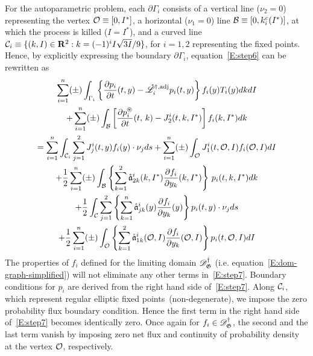 For the autoparametric problem, each $\partial\Gamma_i$ consists of a vertical line ($\nu_2=0$) representing the vertex ${\mathcal O}\equiv[0,I^*]$, a horizontal ($\nu_1=0$) line ${\mathcal B}\equiv[0,{k_i^c(I^*)}]$, at which the process is killed ($I=I^*$), and a curved line ${\mathcal C_i}\equiv \{(k,I)\in \mathbf R^2: k= (-1)^iI\sqrt{3I}/9\}$, for $i=1,2$ representing the fixed points. Hence, by explicitly expressing the boundary $\partial\Gamma_i$, equation~\eqref{E:step6} can be rewritten as
\begin{multline}
\sum_{i=1}^n (\pm) \int_{\Gamma_i} \left\{\frac{\partial p_i}{\partial t}(t,y) - \mathring {\mathscr L}^{\dagger,\text{adj}}_{i} p_{i} (t,y) \right\} f_i(y) T_{i}(y) dk dI\\
+ \sum_{i=1}^n (\pm) \int_{\mathcal B} \left[\frac{\partial p_i^\circledast}{\partial t}(t,\,k) - J_2^{i}(t,k,I^*) \right] f_i(k,I^*) dk\\
= \sum_{i=1}^n \int_{\mathcal C_i} \sum_{j=1}^2 J_j^i(t,y) f_i(y) \cdot \nu_j ds + \sum_{i=1}^n (\pm) \int_{\mathcal O} J_1^i(t,\mathcal O,I) f_i(\mathcal O,I) dI\\
+ \frac12 \sum_{i=1}^n (\pm) \int_{\mathcal B} \left\{\sum_{k=1}^2 \mathring{\mathfrak a}_{2k}^i(k,I^*) \frac{\partial f_i}{\partial y_k}(k,I^*)\right\}\, p_i(t, k, I^*) dk\\
+ \frac12 \int_{\mathcal C} \sum_{j=1}^2 \left\{\sum_{k=1}^n \mathring{\mathfrak a}_{jk}^i(y) \frac{\partial f_i}{\partial y_k}(y)\right\} p_{i}(t,y) \cdot \nu_j ds\\
+ \frac12 \sum_{i=1}^n (\pm) \int_{\mathcal O} \left\{ \sum_{k=1}^2 \mathring{\mathfrak a}_{1k}^i(\mathcal O,I)
\frac{\partial f_i}{\partial y_k}(\mathcal O,I)\right\} p_i(t,\mathcal O,I) dI
\label{E:step7}
\end{multline}
The properties of $f_i$ defined for the limiting domain $\mathscr{D}_\mathfrak G^\dag$ (i.e. equation~\eqref{E:dom-graph-simplified}) will not eliminate any other terms in~\eqref{E:step7}. Boundary conditions for $p_i$ are derived from the right hand side of~\eqref{E:step7}. Along $\mathcal C_i$, which represent regular elliptic fixed points~(non-degenerate), we impose the zero probability flux boundary condition. Hence the first term in the right hand side of~\eqref{E:step7} becomes identically zero. Once again for $f_i \in \mathscr{D}_\mathfrak G^\dag$, the second and the last term vanish by imposing zero net flux and continuity of probability density at the vertex ${\mathcal O}$, respectively.

